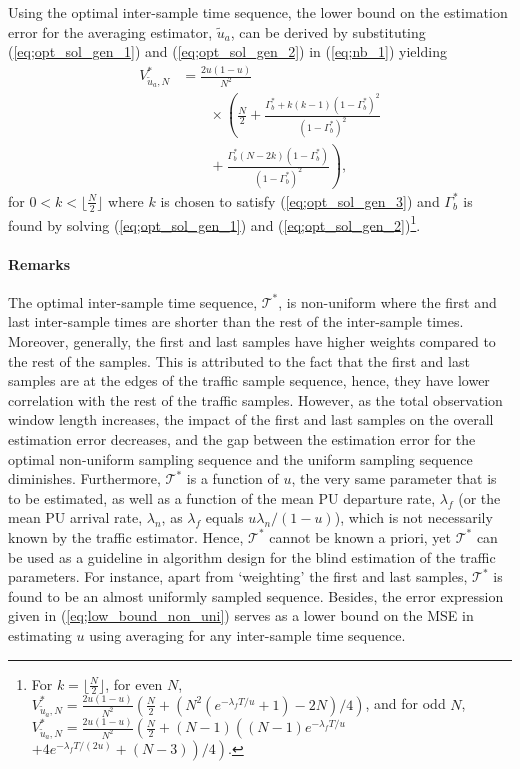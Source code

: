 \documentclass[11pt,draftclsnofoot,journal,onecolumn]{IEEEtran}
\begin{document}
Using the optimal inter-sample time sequence, the lower bound on the estimation error for the averaging estimator, $\tilde{u}_a$, can be derived by substituting (\ref{eq;opt_sol_gen_1}) and (\ref{eq;opt_sol_gen_2}) in (\ref{eq;nb_1}) yielding
\begin{align}
V_{\tilde{u}_a,N}^* &= \frac{2u(1-u)}{N^2}\nonumber\\&\qquad\times\left( \frac{N}{2} + \frac{\Gamma_b^* + k(k-1)(1-\Gamma_b^*)^2}{(1-\Gamma_b^*)^2}\right.\nonumber\\&\left.\qquad + \frac{\Gamma_b^*(N-2k)(1-\Gamma_b^*)}{(1-\Gamma_b^*)^2}\right),
\label{eq;low_bound_non_uni}
\end{align}
for $0<k<\lfloor \frac{N}{2} \rfloor$ where $k$ is chosen to satisfy (\ref{eq;opt_sol_gen_3}) and $\Gamma_b^*$ is found by solving (\ref{eq;opt_sol_gen_1}) and (\ref{eq;opt_sol_gen_2})\footnote{For $k = \lfloor \frac{N}{2} \rfloor$, for even $N$, $V_{\tilde{u}_a,N}^* = \frac{2u(1-u)}{N^2}\left( \frac{N}{2} + \left(N^2(e^{-\lambda_f T/u}+1)-2N\right)/4\right)$, and for odd $N$, $V_{\tilde{u}_a,N}^* = \frac{2u(1-u)}{N^2}\left( \frac{N}{2} + (N-1)\left((N-1)e^{-\lambda_f T/u}\right.\right.$ $\left.\left.+4e^{-\lambda_f T/(2u)}+(N-3)\right)/4\right)$.}.

\paragraph*{Remarks}
\label{sec:u_av_estimation_Remarks}

The optimal inter-sample time sequence, $\mathcal{T}^*$, is non-uniform where the first and last inter-sample times are shorter than the rest of the inter-sample times. Moreover, generally, the first and last samples have higher weights compared to the rest of the samples. This is attributed to the fact that the first and last samples are at the edges of the traffic sample sequence, hence, they have lower correlation with the rest of the traffic samples. However, as the total observation window length increases, the impact of the first and last samples on the overall estimation error decreases, and the gap between the estimation error for the optimal non-uniform sampling sequence and the uniform sampling sequence diminishes. Furthermore, $\mathcal{T}^*$ is a function of $u$, the very same parameter that is to be estimated, as well as a function of the mean PU departure rate, $\lambda_f$ (or the mean PU arrival rate, $\lambda_n$, as $\lambda_f$ equals $u\lambda_n/(1-u)$), which is not necessarily known by the traffic estimator. Hence, $\mathcal{T}^*$ cannot be known a priori, yet $\mathcal{T}^*$ can be used as a guideline in algorithm design for the blind estimation of the traffic parameters. For instance, apart from `weighting' the first and last samples, $\mathcal{T}^*$ is found to be an almost uniformly sampled sequence. Besides, the error expression given in (\ref{eq;low_bound_non_uni}) serves as a lower bound on the MSE in estimating $u$ using averaging for any inter-sample time sequence.
\end{document}
